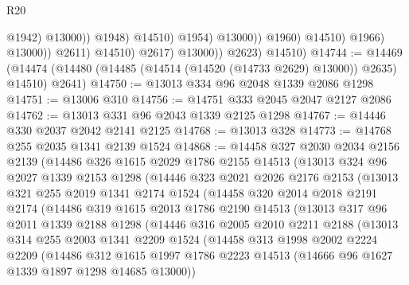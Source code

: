 \begin{lexlean}{R20}
\begin{coremodule}
                                            @1942)
                                          @13000))
                                      @1948)
                                    @14510)
                                  @1954)
                                @13000))
                            @1960)
                          @14510)
                        @1966)
                      @13000))
                  @2611)
                @14510)
              @2617)
            @13000))
        @2623)
      @14510)
@14744 := @14469
    (@14474 (@14480 (@14485 (@14514 (@14520 (@14733 @2629) @13000)) @2635) @14510) @2641)
@14750 := @13013 @334 @96 @2048 @1339 @2086 @1298
@14751 := @13006 @310
@14756 := @14751 @333 @2045 @2047 @2127 @2086
@14762 := @13013 @331 @96 @2043 @1339 @2125 @1298
@14767 := @14446 @330 @2037 @2042 @2141 @2125
@14768 := @13013 @328
@14773 := @14768 @255 @2035 @1341 @2139 @1524
@14868 := @14458
    @327
    @2030
    @2034
    @2156
    @2139
    (@14486
      @326
      @1615
      @2029
      @1786
      @2155
      @14513
      (@13013
        @324
        @96
        @2027
        @1339
        @2153
        @1298
        (@14446
          @323
          @2021
          @2026
          @2176
          @2153
          (@13013
            @321
            @255
            @2019
            @1341
            @2174
            @1524
            (@14458
              @320
              @2014
              @2018
              @2191
              @2174
              (@14486
                @319
                @1615
                @2013
                @1786
                @2190
                @14513
                (@13013
                  @317
                  @96
                  @2011
                  @1339
                  @2188
                  @1298
                  (@14446
                    @316
                    @2005
                    @2010
                    @2211
                    @2188
                    (@13013
                      @314
                      @255
                      @2003
                      @1341
                      @2209
                      @1524
                      (@14458
                        @313
                        @1998
                        @2002
                        @2224
                        @2209
                        (@14486
                          @312
                          @1615
                          @1997
                          @1786
                          @2223
                          @14513
                          (@14666 @96 @1627 @1339 @1897 @1298 @14685 @13000))

\end{coremodule}
\end{lexlean}
